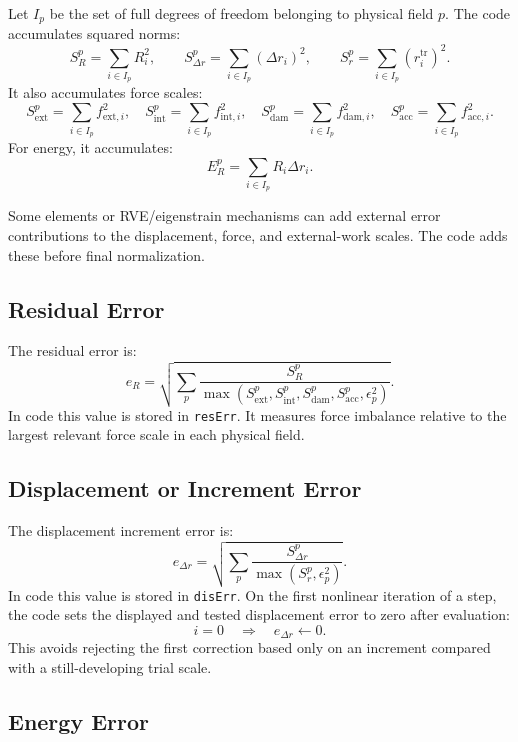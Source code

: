 \documentclass[11pt,a4paper]{article}
\newcommand{\code}[1]{\ifmmode\text{\texttt{\detokenize{#1}}}\else\nolinkurl{#1}\fi}
\begin{document}
Let \(I_p\) be the set of full degrees of freedom belonging to physical field
\(p\).  The code accumulates squared norms:
\[
  S_R^p = \sum_{i\in I_p} R_i^2,
  \qquad
  S_{\Delta r}^p = \sum_{i\in I_p} (\Delta r_i)^2,
  \qquad
  S_r^p = \sum_{i\in I_p} (r_i^{\mathrm{tr}})^2.
\]
It also accumulates force scales:
\[
  S_{\mathrm{ext}}^p = \sum_{i\in I_p} f_{\mathrm{ext},i}^2,\quad
  S_{\mathrm{int}}^p = \sum_{i\in I_p} f_{\mathrm{int},i}^2,\quad
  S_{\mathrm{dam}}^p = \sum_{i\in I_p} f_{\mathrm{dam},i}^2,\quad
  S_{\mathrm{acc}}^p = \sum_{i\in I_p} f_{\mathrm{acc},i}^2.
\]
For energy, it accumulates:
\[
  E_R^p = \sum_{i\in I_p} R_i \Delta r_i.
\]

Some elements or RVE/eigenstrain mechanisms can add external error
contributions to the displacement, force, and external-work scales.  The code
adds these before final normalization.

\subsection{Residual Error}

The residual error is:
\[
  e_R =
  \sqrt{
  \sum_p
  \frac{S_R^p}
       {\max\left(
          S_{\mathrm{ext}}^p,
          S_{\mathrm{int}}^p,
          S_{\mathrm{dam}}^p,
          S_{\mathrm{acc}}^p,
          \epsilon_p^2
       \right)}
  }.
\]
In code this value is stored in \code{resErr}.  It measures force imbalance
relative to the largest relevant force scale in each physical field.

\subsection{Displacement or Increment Error}

The displacement increment error is:
\[
  e_{\Delta r} =
  \sqrt{
  \sum_p
  \frac{S_{\Delta r}^p}
       {\max\left(S_r^p, \epsilon_p^2\right)}
  }.
\]
In code this value is stored in \code{disErr}.  On the first nonlinear
iteration of a step, the code sets the displayed and tested displacement error
to zero after evaluation:
\[
  i = 0 \quad \Rightarrow \quad e_{\Delta r} \leftarrow 0.
\]
This avoids rejecting the first correction based only on an increment compared
with a still-developing trial scale.

\subsection{Energy Error}
\end{document}

